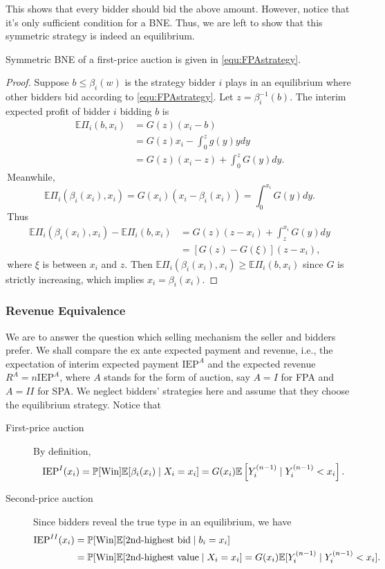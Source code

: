This shows that every bidder should bid the above amount. However, notice that it's only sufficient condition for a BNE. Thus, we are left to show that this symmetric strategy is indeed an equilibrium.
\begin{theorem}
    Symmetric BNE of a first-price auction is given in \eqref{equ:FPAstrategy}.
\end{theorem}
\begin{proof}
    Suppose  $b \leq \beta_{i}(w)$  is the strategy bidder $i$ plays in an equilibrium where other bidders bid according to \eqref{equ:FPAstrategy}. Let  $z=\beta_{i}^{-1}(b)$. The interim expected profit of bidder $i$ bidding $b$ is 
$$\begin{aligned}
\mathbb{E} \Pi_{i}(b, x_i) & =G(z)(x_i-b) \\
& =G(z) x_i-\int_{0}^{z} g(y) y d y \\
& =G(z)(x_i-z)+\int_{0}^{z} G(y) d y.
\end{aligned}$$
\,Meanwhile,
\begin{equation}\label{equ:IRinFPA}
    \mathbb{E} \Pi_{i}(\beta_i(x_i), x_i)=G(x_i)(x_i-\beta_i(x_i))=\int_{0}^{x_i} G(y) d y.
\end{equation}
\,Thus
$$\begin{aligned}
\mathbb{E} \Pi_{i}(\beta_i(x_i), x_i)-\mathbb{E} \Pi_{i}(b, x_i) & =G(z)(z-x_i)+\int_{z}^{x_i} G(y) d y \\
& =[G(z)-G(\xi)](z-x_i),
\end{aligned}$$
\,where $\xi$ is between $x_i$ and $z$. Then $\mathbb{E} \Pi_{i}(\beta_i(x_i), x_i)\geq\mathbb{E} \Pi_{i}(b, x_i)$ since $G$ is strictly increasing, which implies $x_i=\beta_i(x_i)$.
\end{proof}
\subsubsection{Revenue Equivalence}
We are to answer the question which selling mechanism the seller and bidders prefer. We shall compare the ex ante expected payment and revenue, i.e., the expectation of interim expected payment \(\mathrm{IEP}^{A}\) and the expected revenue \(R^{A}=n\mathrm{IEP}^{A}\), where \(A\) stands for the form of auction, say \(A=I\) for FPA and \(A=II\) for SPA.
We neglect bidders' strategies here and assume that they choose the equilibrium strategy. Notice that
\begin{description}
    \item[First-price auction]  By definition, $$\mathrm{IEP}^{I}(x_i)=\mathbb{P}[\text{Win}]\mathbb{E}[\beta_i(x_i)\mid X_i=x_i]=G(x_i)\mathbb{E}\left[Y_{i}^{(n-1)} \mid Y_{i}^{(n-1)}<x_{i}\right].$$
    \item[Second-price auction] Since bidders reveal the true type in an equilibrium, we have
    $$\begin{aligned}
        \mathrm{IEP}^{II}(x_i)&=\mathbb{P}[\text{Win}]\mathbb{E}[\text{2nd-highest bid}\mid b_i=x_i]\\
        &=\mathbb{P}[\text{Win}]\mathbb{E}[\text{2nd-highest value}\mid X_i=x_i]
        =G(x_i)\mathbb{E}[Y_i^{(n-1)}\mid Y_i^{(n-1)}< x_i].
    \end{aligned}$$
\end{description}


